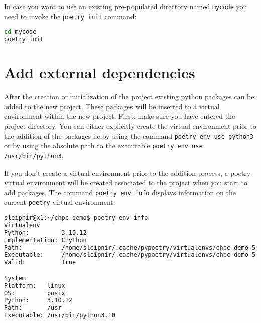 \documentclass[10pt]{article}
\begin{document}
In case you want to use an existing pre-populated directory named \texttt{mycode} you need to invoke the \lstinline[language=bash]{poetry init} command:
\begin{lstlisting}[language=bash]
cd mycode
poetry init
\end{lstlisting}

\section{Add external dependencies}
After the creation or initialization of the project existing python packages can be added to the new project.
These packages will be inserted to a virtual environment within the new project. First, make sure you have entered 
the project directory.
You can either explicitly create the virtual environment prior to the addition of the packages i.e.\;by using the 
command \lstinline[language=bash]{poetry env use python3} or by using the absolute path to the executable \lstinline[language=bash]{poetry env use /usr/bin/python3}.

If you don't create a virtual environment prior to the addition process, a poetry virtual environment 
will be created associated to the project when you start to add packages.
The command \lstinline[language=bash]{poetry env info} displays information on the current \lstinline[language=bash]{poetry} virtual environment.
\begin{lstlisting}[language=bash]
sleipnir@x1:~/chpc-demo$ poetry env info
Virtualenv
Python:         3.10.12
Implementation: CPython
Path:           /home/sleipnir/.cache/pypoetry/virtualenvs/chpc-demo-5_MZDma8-py3.10
Executable:     /home/sleipnir/.cache/pypoetry/virtualenvs/chpc-demo-5_MZDma8-py3.10/bin/python
Valid:          True

System
Platform:   linux
OS:         posix
Python:     3.10.12
Path:       /usr
Executable: /usr/bin/python3.10
\end{lstlisting}
\end{document}
